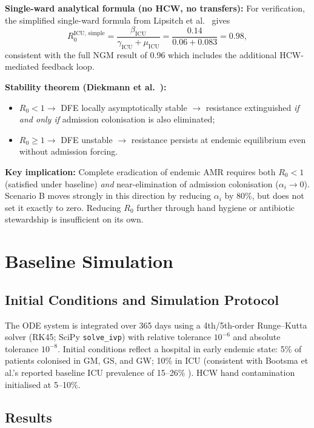 \documentclass[12pt,a4paper]{article}
\begin{document}
\textbf{Single-ward analytical formula (no HCW, no transfers):} For verification, the simplified single-ward formula from Lipsitch et al.\ \cite{lipsitch2000} gives
\begin{equation}
\label{eq:6}
R_0^{\text{ICU, simple}} = \frac{\beta_{\text{ICU}}}{\gamma_{\text{ICU}} + \mu_{\text{ICU}}}
= \frac{0.14}{0.06 + 0.083} = 0.98,
\end{equation}
consistent with the full NGM result of 0.96 which includes the additional HCW-mediated feedback loop.

\textbf{Stability theorem (Diekmann et al.\ \cite{diekmann1990}):}
\begin{itemize}
  \item $R_0 < 1 \rightarrow$ DFE locally asymptotically stable $\rightarrow$ resistance extinguished \emph{if and only if} admission colonisation is also eliminated;
  \item $R_0 \geq 1 \rightarrow$ DFE unstable $\rightarrow$ resistance persists at endemic equilibrium even without admission forcing.
\end{itemize}

\textbf{Key implication:} Complete eradication of endemic AMR requires both $R_0 < 1$ (satisfied under baseline) \emph{and} near-elimination of admission colonisation ($\alpha_i \to 0$). Scenario B moves strongly in this direction by reducing $\alpha_i$ by 80\%, but does not set it exactly to zero. Reducing $R_0$ further through hand hygiene or antibiotic stewardship is insufficient on its own.

\section{Baseline Simulation}

\subsection{Initial Conditions and Simulation Protocol}

The ODE system is integrated over 365 days using a 4th/5th-order Runge--Kutta solver (RK45; SciPy \texttt{solve\_ivp}) with relative tolerance $10^{-6}$ and absolute tolerance $10^{-8}$. Initial conditions reflect a hospital in early endemic state: 5\% of patients colonised in GM, GS, and GW; 10\% in ICU (consistent with Bootsma et al.'s reported baseline ICU prevalence of 15--26\% \cite{bootsma_preprint}). HCW hand contamination initialised at 5--10\%.

\subsection{Results}
\end{document}
